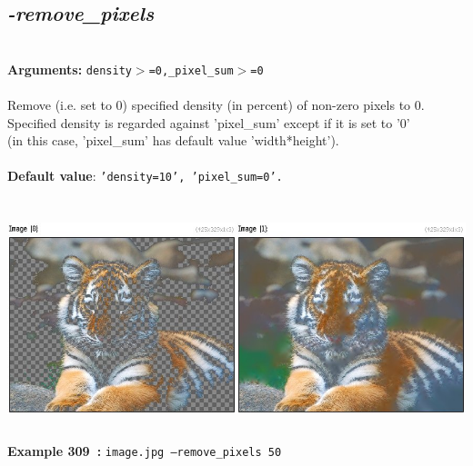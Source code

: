 \documentclass[a4paper,11pt,twoside]{book}
\begin{document}
\subsection{\emph{-remove\_pixels} }\vspace*{-0.5em}
~\\\textbf{Arguments: } 
{\small \texttt{density$>$=0,\_pixel\_sum$>$=0}}\\~\\
Remove (i.e. set to 0) specified density (in percent) of non-zero pixels to 0.
~\\Specified density is regarded against 'pixel\_sum' except if it is set to '0'
~\\(in this case, 'pixel\_sum' has default value 'width*height').
~\\~\\\textbf{Default value}: {\small \texttt{'density=10', 'pixel\_sum=0'.}}
\begin{center}\includegraphics[keepaspectratio=true,height=7cm,width=\textwidth]{img/gmic_def309.jpg}\\
{\footnotesize \textbf{Example 309~:} \texttt{image.jpg --remove\_pixels 50}}
\end{center}
\end{document}
